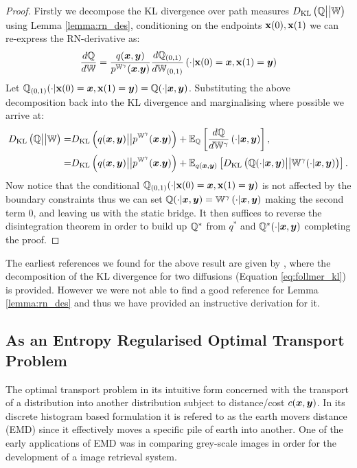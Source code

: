 \documentclass[a4paper,12pt,twoside,openright]{report}
\theoremstyle{definition}
\begin{document}
\begin{proof}
Firstly we decompose the KL divergence over path measures $D_{\mathrm{KL}}\left({\mathbb{Q}} \big|\big| \mathbb{W}\right)$ using Lemma \ref{lemma:rn_des}, conditioning on the endpoints ${\mathbf{x}}(0), {\mathbf{x}}(1)$ we can re-express the RN-derivative as:
\begin{align}
    \frac{d{\mathbb{Q}}}{d\mathbb{W}} = \frac{q({\bm{x}}, {\bm{y}})}{p^{\mathbb{W}^{\gamma}}({\bm{x}}. {\bm{y}})}\frac{d{\mathbb{Q}}_{(0,1)}}{d\mathbb{W}_{(0,1)}}\left(\cdot | {\mathbf{x}}(0) ={\bm{x}}, {\mathbf{x}}(1) ={\bm{y}}\right)
\end{align}
Let ${\mathbb{Q}}_{(0,1)}(\cdot |  {\mathbf{x}}(0) ={\bm{x}}, {\mathbf{x}}(1) ={\bm{y}}) = {\mathbb{Q}}(\cdot |  {\bm{x}},{\bm{y}})$. Substituting the above decomposition back into the KL divergence and marginalising where possible we arrive at: 
\begin{align} \label{eq:follmer_kl}
    D_{\mathrm{KL}}\left({\mathbb{Q}} \big|\big| \mathbb{W}\right) =&  D_{\mathrm{KL}}\left(q({\bm{x}}, {\bm{y}}) \big|\big| p^{\mathbb{W}^{\gamma}}({\bm{x}}. {\bm{y}}) \right)  + \mathbb{E}_{{\mathbb{Q}}}\left[\frac{d{\mathbb{Q}}}{d\mathbb{W}^\gamma}\left(\cdot | {\bm{x}}, {\bm{y}}\right)\right], \nonumber \\
    =&  D_{\mathrm{KL}}\left(q({\bm{x}}, {\bm{y}}) \big|\big| p^{\mathbb{W}^{\gamma}}({\bm{x}}. {\bm{y}}) \right)  + \mathbb{E}_{q({\bm{x}},{\bm{y}})}\left[D_{\mathrm{KL}}\left({\mathbb{Q}}(\cdot |  {\bm{x}},{\bm{y}})\big|\big|\mathbb{W}^{\gamma}(\cdot |  {\bm{x}},{\bm{y}})\right)\right].
\end{align}
Now notice that the conditional ${\mathbb{Q}}_{(0,1)}(\cdot |  {\mathbf{x}}(0) ={\bm{x}}, {\mathbf{x}}(1) ={\bm{y}})$ is not affected by the boundary constraints thus we can set ${\mathbb{Q}}(\cdot | {\bm{x}},{\bm{y}}) = \mathbb{W}^\gamma\left(\cdot | {\bm{x}}, {\bm{y}}\right)$ making the second term 0, and leaving us with the static bridge. It then suffices to reverse the disintegration theorem in order to build up ${\mathbb{Q}}^{*}$ from $q^{*}$ and ${\mathbb{Q}}^{*}(\cdot | {\bm{x}},{\bm{y}})$ completing the proof.
\end{proof}

The earliest references we found for the above result are given by \cite{follmer1988random}, where the decomposition of the KL divergence for two diffusions (Equation \ref{eq:follmer_kl}) is provided. However we were not able to find a good reference for Lemma \ref{lemma:rn_des} and thus we have provided an instructive derivation for it.
\subsection{As an Entropy Regularised Optimal Transport Problem}

The optimal transport problem in its intuitive form concerned with the transport of a distribution into another distribution subject to distance/cost $c({\bm{x}},{\bm{y}})$. In its discrete histogram based formulation it is refered to as the earth movers distance (EMD) \citep{levina2001earth} since it effectively moves a specific pile of earth into another. One of the early applications of EMD was in comparing grey-scale images in order for the development of a image retrieval system. 
\end{document}
